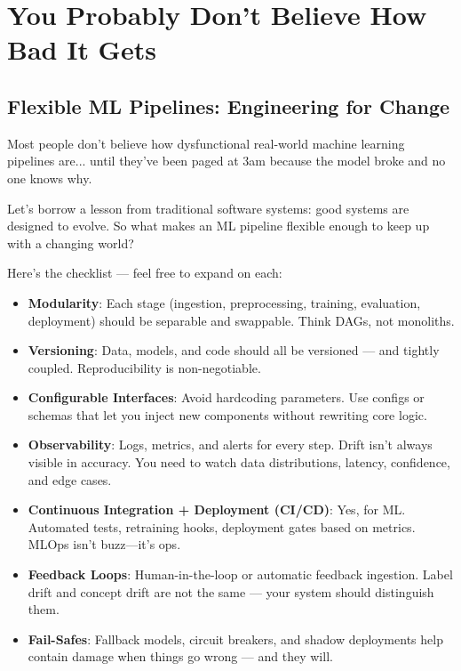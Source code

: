 \section{You Probably Don’t Believe How Bad It Gets}

\subsection{Flexible ML Pipelines: Engineering for Change}

Most people don’t believe how dysfunctional real-world machine learning pipelines are...  until they’ve been paged at 3am because the model broke and no one knows why.


Let’s borrow a lesson from traditional software systems: good systems are designed to evolve. So what makes an ML pipeline flexible enough to keep up with a changing world?

Here’s the checklist — feel free to expand on each:

\begin{itemize}
    \item \textbf{Modularity}: Each stage (ingestion, preprocessing, training, evaluation, deployment) should be separable and swappable. Think DAGs, not monoliths.

    \item \textbf{Versioning}: Data, models, and code should all be versioned — and tightly coupled. Reproducibility is non-negotiable.

    \item \textbf{Configurable Interfaces}: Avoid hardcoding parameters. Use configs or schemas that let you inject new components without rewriting core logic.

    \item \textbf{Observability}: Logs, metrics, and alerts for every step. Drift isn’t always visible in accuracy. You need to watch data distributions, latency, confidence, and edge cases.

    \item \textbf{Continuous Integration + Deployment (CI/CD)}: Yes, for ML. Automated tests, retraining hooks, deployment gates based on metrics. MLOps isn’t buzz—it’s ops.

    \item \textbf{Feedback Loops}: Human-in-the-loop or automatic feedback ingestion. Label drift and concept drift are not the same — your system should distinguish them.

    \item \textbf{Fail-Safes}: Fallback models, circuit breakers, and shadow deployments help contain damage when things go wrong — and they will.
\end{itemize}



